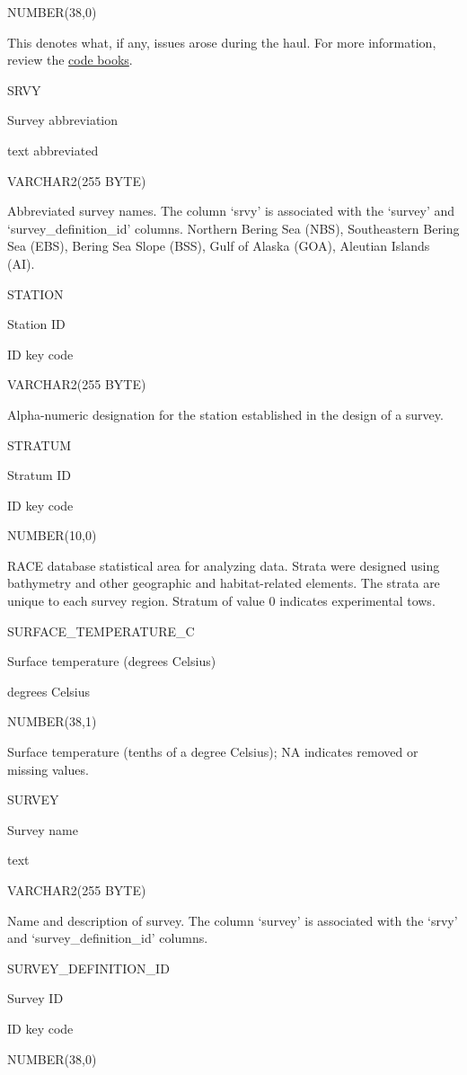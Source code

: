 \documentclass[
  letterpaper,
  oneside,
  open=any]{scrbook}
\begin{document}
NUMBER(38,0)

This denotes what, if any, issues arose during the haul. For more
information, review the
\href{https://www.fisheries.noaa.gov/resource/document/groundfish-survey-species-code-manual-and-data-codes-manual}{code
books}.

SRVY

Survey abbreviation

text abbreviated

VARCHAR2(255 BYTE)

Abbreviated survey names. The column `srvy' is associated with the
`survey' and `survey\_definition\_id' columns. Northern Bering Sea
(NBS), Southeastern Bering Sea (EBS), Bering Sea Slope (BSS), Gulf of
Alaska (GOA), Aleutian Islands (AI).

STATION

Station ID

ID key code

VARCHAR2(255 BYTE)

Alpha-numeric designation for the station established in the design of a
survey.

STRATUM

Stratum ID

ID key code

NUMBER(10,0)

RACE database statistical area for analyzing data. Strata were designed
using bathymetry and other geographic and habitat-related elements. The
strata are unique to each survey region. Stratum of value 0 indicates
experimental tows.

SURFACE\_TEMPERATURE\_C

Surface temperature (degrees Celsius)

degrees Celsius

NUMBER(38,1)

Surface temperature (tenths of a degree Celsius); NA indicates removed
or missing values.

SURVEY

Survey name

text

VARCHAR2(255 BYTE)

Name and description of survey. The column `survey' is associated with
the `srvy' and `survey\_definition\_id' columns.

SURVEY\_DEFINITION\_ID

Survey ID

ID key code

NUMBER(38,0)
\end{document}
